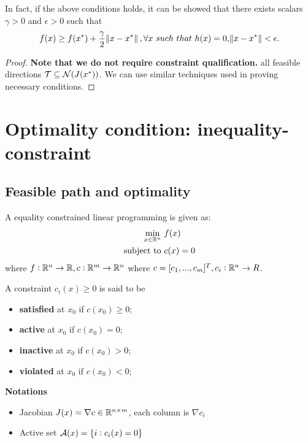 \begin{refsection}
\begin{theorem}
In fact, if the above conditions holds, it can be showed that there exists scalars $\gamma > 0$ and $\epsilon > 0$ such that
$$f(x) \geq f(x^*) + \frac{\gamma}{2}\norm{x - x^*},\forall x ~such~that~ h(x) = 0, \norm{x - x^*} < \epsilon.$$
\end{theorem}
\begin{proof}
\textbf{Note that we do not require constraint qualification.} all feasible directions $\mathcal{T} \subseteq \mathcal{N}(J(x^*))$. We can use similar techniques used in proving necessary conditions. 
\end{proof}



\section{Optimality condition: inequality-constraint}
\subsection{Feasible path and optimality}
\begin{definition}\label{ch:constrained-nonlinear-optimization:def:inequalityconstraintoptimization}
A equality constrained linear programming is given as:
\begin{align*}
    \min_{x\in \mathbb{R}^n} ~ & f(x)\\
    \text{subject to} ~ & c(x) = 0
\end{align*}
where $f:\mathbb{R}^n \to \mathbb{R},c:\mathbb{R}^m\to \mathbb{R}^n$ where $c=[c_1,...,c_m]^T,c_i:\mathbb{R}^n \to R$.
\end{definition}

\begin{definition}
A constraint $c_i(x) \geq 0$ is said to be
\begin{itemize}
    \item \textbf{satisfied} at $x_0$ if $c(x_0) \geq 0$;
    \item \textbf{active} at $x_0$ if $c(x_0) = 0$;
    \item \textbf{inactive} at $x_0$ if $c(x_0) > 0$;
    \item \textbf{violated} at $x_0$ if $c(x_0) < 0$;
\end{itemize}
\end{definition}

\begin{mdframed}
\textbf{Notations}\\
\begin{itemize}
    \item Jacobian $J(x) = \nabla c \in \mathbb{R}^{n\times m}$, each column is $\nabla c_i$
    \item Active set $\mathcal{A}(x)=\{i: c_i(x) = 0\}$
\end{itemize}
\end{mdframed}




\end{refsection}
